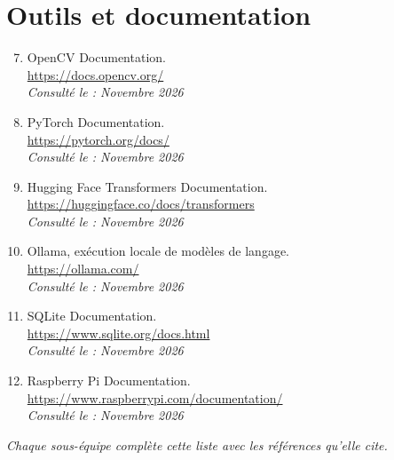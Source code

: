 \section*{Outils et documentation}

\begin{enumerate}
\setcounter{enumi}{6}

\item OpenCV Documentation.\\
\url{https://docs.opencv.org/}\\
\textit{Consulté le : Novembre 2026}

\item PyTorch Documentation.\\
\url{https://pytorch.org/docs/}\\
\textit{Consulté le : Novembre 2026}

\item Hugging Face Transformers Documentation.\\
\url{https://huggingface.co/docs/transformers}\\
\textit{Consulté le : Novembre 2026}

\item Ollama, exécution locale de modèles de langage.\\
\url{https://ollama.com/}\\
\textit{Consulté le : Novembre 2026}

\item SQLite Documentation.\\
\url{https://www.sqlite.org/docs.html}\\
\textit{Consulté le : Novembre 2026}

\item Raspberry Pi Documentation.\\
\url{https://www.raspberrypi.com/documentation/}\\
\textit{Consulté le : Novembre 2026}

\end{enumerate}

\noindent\textit{Chaque sous-équipe complète cette liste avec les références qu'elle cite.}
